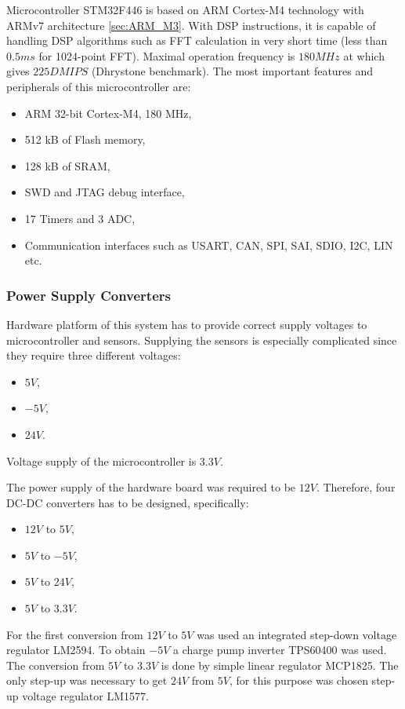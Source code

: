 \documentclass[twoside]{ctuthesis}
\theoremstyle{plain}
\theoremstyle{definition}
\theoremstyle{note}
\begin{document}
	Microcontroller STM32F446 is based on ARM Cortex-M4 technology with ARMv7 architecture \ref{sec:ARM_M3}. With DSP instructions, it is capable of handling DSP algorithms such as FFT calculation in very short time (less than $0.5 ms$ for 1024-point FFT). Maximal operation frequency is $180 MHz$ at which gives $225 DMIPS$ (Dhrystone benchmark). The most important features and peripherals of this microcontroller are:
\begin{itemize}
	\setlength{\itemsep}{5pt}
	\item ARM 32-bit Cortex-M4, 180 MHz,
	\item 512 kB of Flash memory,
	\item 128 kB of SRAM,
	\item SWD and JTAG debug interface,
	\item 17 Timers and 3 ADC,
	\item Communication interfaces such as USART, CAN, SPI, SAI, SDIO, I2C, LIN etc.
\end{itemize}	
\subsubsection{Power Supply Converters}
Hardware platform of this system has to provide correct supply voltages to microcontroller and sensors. Supplying the sensors is especially complicated since they require three different voltages:
\begin{itemize}
	\setlength{\itemsep}{5pt}
	\item $5 V$,
	\item $-5 V$,
	\item $24 V$.
\end{itemize}
Voltage supply of the microcontroller is $3.3 V$.

The power supply of the hardware board was required to be $12 V$. Therefore, four DC-DC converters has to be designed, specifically:
\begin{itemize}
	\setlength{\itemsep}{5pt}
	\item $12 V$ to $5 V$,
	\item $5 V$ to $-5 V$,
	\item $5 V$ to $24 V$,
	\item $5 V$ to $3.3 V$.
\end{itemize}

For the first conversion from $12 V$ to $5 V$ was used an integrated step-down voltage regulator LM2594. To obtain $-5 V$ a charge pump inverter TPS60400 was used. The conversion from $5 V$ to $3.3 V$ is done by simple linear regulator MCP1825. The only step-up was necessary to get $24 V$ from $5 V$, for this purpose was chosen step-up voltage regulator LM1577.
\end{document}
